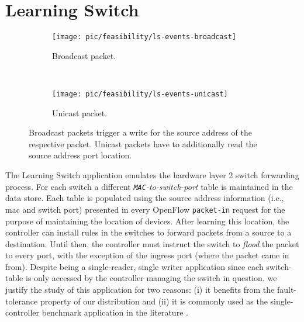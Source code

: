 \section{Learning Switch}
\label{sec:feasibility:ls}
\glsresetall

\begin{figure}[ht]

  \begin{subfigure}[b]{0.5\textwidth}
                \centering
                \texttt{[image: pic/feasibility/ls-events-broadcast]}
                \caption{Broadcast packet.}
                \label{fig:ls:interaction:broadcast}
        \end{subfigure}%
        ~
        \begin{subfigure}[b]{0.5\textwidth}
                \centering
                \texttt{[image: pic/feasibility/ls-events-unicast]}
                \caption{Unicast packet.}
                \label{fig:ls:interaction:unicast}
        \end{subfigure}
        \caption[Learning Switch workloads]{Broadcast packets trigger a write for the source address of the respective packet. Unicast packets have to additionally read the source address port location.}
        \label{fig:ls:interaction}
\end{figure}

The Learning Switch application emulates the hardware layer 2 switch
forwarding process. 
For each switch a different \emph{\texttt{MAC}-to-switch-port}
table is maintained in the data store. Each table is populated using the source address information (i.e.,
\gls{mac} and switch port)  presented in every OpenFlow \texttt{packet-in}
request for the purpose of maintaining the location of devices. 
After learning this location, the controller can install
rules in the switches to forward packets from a source to a
destination. Until then, the controller must instruct the switch to
\emph{flood} the packet to every port, with the exception of
the ingress port (where the packet came in from). Despite being a
single-reader, single writer application since each switch-table is
only accessed by the controller managing the switch in question. 
we justify the study  of this application for two
reasons: (i) it benefits from the fault-tolerance property of
our distribution and (ii) it is commonly used as the
single-controller benchmark application in the literature
\cite{Tootoonchian:2012uia,beacon-hotsdn}. 


